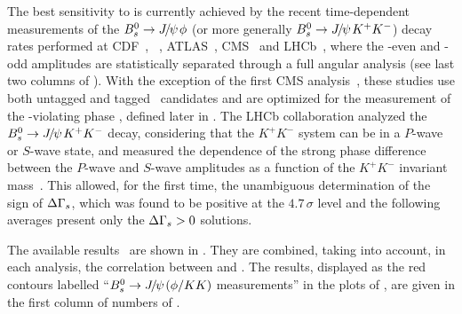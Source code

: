 
The best sensitivity to \DGs is currently achieved 
by the recent time-dependent measurements
of the $B^0_s\to{J\mskip -3mu/\mskip -2mu\psi\mskip 2mu}\phi$ (or more generally $B^0_s\to{J\mskip -3mu/\mskip -2mu\psi\mskip 2mu} K^+K^-$) decay rates performed at
CDF~\cite{Aaltonen:2012ie,*CDF:2011af,*Aaltonen:2007he_mod,*Aaltonen:2007gf_mod},
\dzero~\cite{Abazov:2011ry,*Abazov_mod:2008fj,*Abazov:2007tx_mod_cont}, 
ATLAS~\cite{Aad:2014cqa,*Aad:2012kba_cont}, CMS~\cite{CMS-PAS-BPH-11-006,CMS-PAS-BPH-13-012}
and LHCb~\cite{LHCB-PAPER-2014-059,*Aaij:2013oba_supersede2},
where the \CP-even and \CP-odd
amplitudes are statistically separated through a full angular analysis
(see last two columns of ). 
With the exception of the first CMS analysis~\cite{CMS-PAS-BPH-11-006},
these studies use both untagged and tagged \Bs\ candidates and 
are optimized for the measurement of the \CP-violating 
phase \phiccbars, defined later in .
The LHCb collaboration analyzed the $B^0_s \to {J\mskip -3mu/\mskip -2mu\psi\mskip 2mu} K^+K^-$
decay, considering that the $K^+K^-$ system can be in a $P$-wave or $S$-wave state, 
and measured the dependence of the strong phase difference between the 
$P$-wave and $S$-wave amplitudes as a function of the $K^+K^-$ invariant
mass~\cite{Aaij:2012eq}. 
This allowed, for the first time, the unambiguous determination of the sign of 
$\Delta\Gamma_{s}$, which was found to be positive at the $4.7\,\sigma$ level and the
following averages present only the $\Delta\Gamma_{s} > 0$ solutions.


The available results~\cite{Aaltonen:2012ie,*CDF:2011af,*Aaltonen:2007he_mod,*Aaltonen:2007gf_mod,Abazov:2011ry,*Abazov_mod:2008fj,*Abazov:2007tx_mod_cont,Aad:2014cqa,*Aad:2012kba_cont,CMS-PAS-BPH-11-006,CMS-PAS-BPH-13-012,LHCB-PAPER-2014-059,*Aaij:2013oba_supersede2}
are shown in . They are combined, taking into account, in each analysis, the correlation between \DGs and \Gs.
The results, displayed as the red contours labelled ``$B^0_s \to {J\mskip -3mu/\mskip -2mu\psi\mskip 2mu} (\phi/KK)$ measurements'' in the
plots of , are given in the first column of numbers of .

